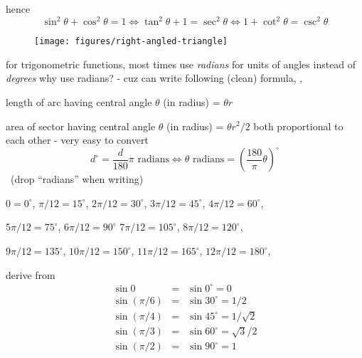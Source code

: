 \documentclass[17pt,landscape]{foils}
\begin{document}
hence
$$
\sin^2 \theta + \cos^2 \theta = 1
\Leftrightarrow
\tan^2 \theta + 1 = \sec^2 \theta
\Leftrightarrow
1 + \cot^2 \theta = \csc^2 \theta
$$
\eit
\vfill
\begin{figure}
\begin{center}
\texttt{[image: figures/right-angled-triangle]}
\label{fig:triangle for pythagorean theorem}
\end{center}
\end{figure}
\bit
\item
for trigonometric functions, most times use \emph{radians} for units of angles instead of \emph{degrees}
\vitem
why use radians? - cuz can write following (clean) formula, \eg,
\bit
\item
{length of arc having central angle} $\theta$ { (in radius)} = $\theta r$
\item
{area of sector having central angle} $\theta$ { (in radius)} = $\theta r^2 /2$
\eit
\vitem
both proportional to each other - very easy to convert
$$
d^\circ = \frac{d}{180} \pi \mbox{ radians}
\Leftrightarrow
\theta \mbox{ radians} = \left( \frac{180}{\pi} \theta \right)^\circ
$$
\vitem
\eg\ (drop ``radians'' when writing)
\bit
\item
$0 = 0^\circ$,
$\pi/12 = 15^\circ$,
$2\pi/12 = 30^\circ$,
$3\pi/12 = 45^\circ$,
$4\pi/12 = 60^\circ$,
\item
$5\pi/12 = 75^\circ$,
$6\pi/12 = 90^\circ$
$7\pi/12 = 105^\circ$,
$8\pi/12 = 120^\circ$,
\item
$9\pi/12 = 135^\circ$,
$10\pi/12 = 150^\circ$,
$11\pi/12 = 165^\circ$,
$12\pi/12 = 180^\circ$,
\eit
\eit
{}
\bit
\item
derive from 
\begin{eqnarray*}
\sin 0 &=& \sin 0^\circ = 0
\\
\sin ({\pi}/{6}) &=& \sin 30^\circ = 1/2
\\
\sin ({\pi}/{4}) &=& \sin 45^\circ = 1/\sqrt{2}
\\
\sin ({\pi}/{3}) &=& \sin 60^\circ = \sqrt{3}/{2}
\\
\sin ({\pi}/{2}) &=& \sin 90^\circ = 1
\end{eqnarray*}
\end{document}
